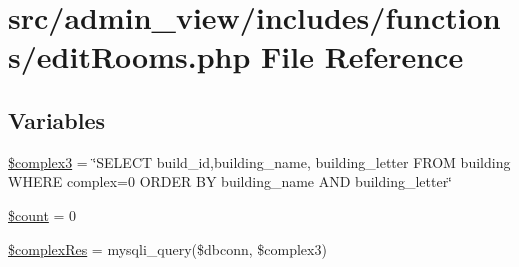 \hypertarget{editRooms_8php}{\section{src/admin\-\_\-view/includes/functions/edit\-Rooms.php \-File \-Reference}
\label{editRooms_8php}
}
\subsection*{\-Variables}
\begin{DoxyCompactItemize}
\item 
\hyperlink{editRooms_8php_a6f8a1bc2bbda3a3b8f381cc7b0b5f2fb}{\$complex3} = \char`\"{}\-S\-E\-L\-E\-C\-T build\-\_\-id,building\-\_\-name, building\-\_\-letter \-F\-R\-O\-M building \-W\-H\-E\-R\-E complex=0 \-O\-R\-D\-E\-R \-B\-Y building\-\_\-name \-A\-N\-D building\-\_\-letter\char`\"{}
\item 
\hyperlink{editRooms_8php_af789423037bbc89dc7c850e761177570}{\$count} = 0
\item 
\hyperlink{editRooms_8php_a8e5989179b69fda571d827939d1933d4}{\$complex\-Res} = mysqli\-\_\-query(\$dbconn, \$complex3)
\end{DoxyCompactItemize}


